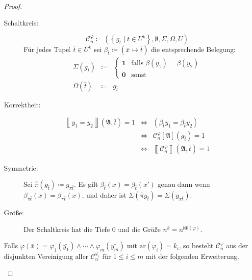 \begin{proof}
\begin{casenv}
\begin{description}
\item [{Schaltkreis:}] 
\[
\mathcal{C}_{n}^{\varphi}\coloneqq\left(\left\{ g_{\bar{t}}\mid\bar{t}\in U^{k}\right\} ,\emptyset,\Sigma,\Omega,U\right)
\]
Für jedes Tupel $\bar{t}\in U^{k}$ sei $\beta_{\bar{t}}\coloneqq\left(\bar{x}\mapsto\bar{t}\right)$
die entsprechende Belegung:
\begin{eqnarray*}
\Sigma\left(g_{\bar{t}}\right) & \coloneqq & \begin{cases}
\mathbf{1} & \mathrm{falls}\,\,\beta\left(y_{1}\right)=\beta\left(y_{2}\right)\\
\mathbf{0} & \mathrm{sonst}
\end{cases}\\
\Omega\left(\bar{t}\right) & \coloneqq & g_{\bar{t}}
\end{eqnarray*}
\item [{Korrektheit:}] 
\begin{eqnarray*}
\left\llbracket y_{1}\dot{=}y_{2}\right\rrbracket \left(\mathfrak{A},\bar{t}\right)=1 & \Leftrightarrow & \left(\beta_{\bar{t}}y_{1}=\beta_{\bar{t}}y_{2}\right)\\
 & \Leftrightarrow & \mathcal{C}_{n}^{\varphi}\left[\mathfrak{A}\right]\left(g_{\bar{t}}\right)=1\\
 & \Leftrightarrow & \left\llbracket \mathcal{C}_{n}^{\varphi}\right\rrbracket \left(\mathfrak{A},\bar{t}\right)=1
\end{eqnarray*}
\item [{Symmetrie:}] Sei $\hat{\pi}\left(g_{\bar{t}}\right)\coloneqq g_{\pi\bar{t}}$.
Es gilt $\beta_{\bar{t}}\left(x\right)=\beta_{\bar{t}}\left(x'\right)$
genau dann wenn $\beta_{\pi\bar{t}}\left(x\right)=\beta_{\pi\bar{t}}\left(x\right)$,
und daher ist $\Sigma\left(\hat{\pi}g_{\bar{t}}\right)=\Sigma\left(g_{\pi\bar{t}}\right)$.
\item [{Größe:}] Der Schaltkreis hat die Tiefe $0$ und die Größe $n^{k}=n^{\mathtt{MF}\left(\varphi\right)}$.
\end{description}
\item Falls $\varphi\left(\bar{x}\right)=\varphi_{1}\left(\bar{y_{1}}\right)\wedge\cdots\wedge\varphi_{m}\left(\bar{y_{m}}\right)$
mit $\mathrm{ar}\left(\varphi_{i}\right)=k_{i}$, so besteht $\mathcal{C}_{n}^{\varphi}$
aus der disjunkten Vereinigung aller $\mathcal{C}_{n}^{\varphi_{i}}$
für $1\leqslant i\leqslant m$ mit der folgenden Erweiterung.


\end{casenv}
\end{proof}
